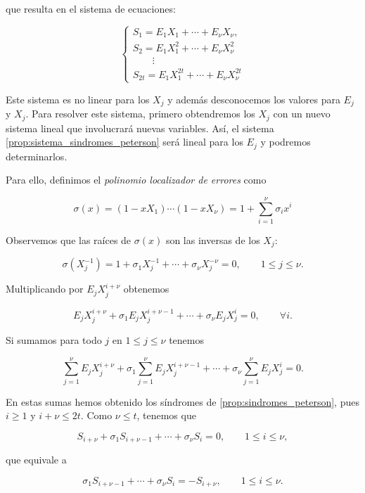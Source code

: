 que resulta en el sistema de ecuaciones:

\begin{equation}
    \label{prop:sistema_sindromes_peterson}
    \left\{
    \begin{array}{c} 
        S_1 = E_1 X_1 + \cdots + E_\nu X_\nu,\\
        S_2 = E_1 X_1^2 + \cdots + E_\nu X_\nu^2\\
        \qquad \vdots \\
        S_{2t} = E_1 X_1^{2t} + \cdots + E_\nu X_\nu^{2t}
    \end{array}
    \right.
\end{equation}

Este sistema es no linear para los $X_j$ y además desconocemos los valores para $E_j$ y $X_j$. Para resolver este sistema, primero obtendremos los $X_j$ con un nuevo sistema lineal que involucrará nuevas variables. Así, el sistema \ref{prop:sistema_sindromes_peterson} será lineal para los $E_j$ y podremos determinarlos.

Para ello, definimos el \emph{polinomio localizador de errores} como

$$\sigma(x) = (1 - xX_1) \cdots (1 - xX_\nu) = 1 + \sum_{i=1}^\nu \sigma_i x^i$$

Observemos que las raíces de $\sigma(x)$ son las inversas de los $X_j$:

$$\sigma \left( X_j^{-1} \right) = 1 + \sigma_1 X_j^{-1} + \cdots + \sigma_\nu X_j^{-\nu} = 0, \qquad 1 \leq j \leq \nu .$$

Multiplicando por $E_j X_j^{i + \nu}$ obtenemos

$$E_j X_j^{i + \nu} + \sigma_1 E_j X_j^{i + \nu - 1} + \cdots + \sigma_\nu E_j X_j^{i} = 0, \qquad \forall i.$$

Si sumamos para todo $j$ en $1 \leq j \leq \nu$ tenemos

$$\sum_{j=1}^\nu E_j X_j^{i + \nu} + \sigma_1 \sum_{j=1}^\nu E_j X_j^{i + \nu - 1} + \cdots + \sigma_\nu \sum_{j=1}^\nu E_j X_j^{i} = 0.$$

En estas sumas hemos obtenido los síndromes de \ref{prop:sindromes_peterson}, pues $i \geq 1$ y $i + \nu \leq 2t$. Como $\nu \leq t$, tenemos que

$$S_{i + \nu} + \sigma_1 S_{i + \nu - 1} + \cdots + \sigma_\nu S_i = 0, \qquad 1 \leq i \leq \nu ,$$

que equivale a 

$$\sigma_1 S_{i + \nu - 1} + \cdots + \sigma_\nu S_i = -S_{i + \nu}, \qquad 1 \leq i \leq \nu .$$

